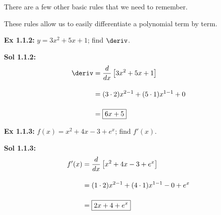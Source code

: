 There are a few other basic rules that we need to remember. 

\begin{center}
\end{center}

These rules allow us to easily differentiate a polynomial term by term.

\begin{tcolorbox}[example]
    \textbf{Ex 1.1.2: } $y = 3x^2 + 5x + 1$; find $\deriv$. 
\end{tcolorbox}
\begin{tcolorbox}[solution]
    \textbf{Sol 1.1.2: } \begin{align*}
        \deriv & = \diff \left[3x^2 + 5x + 1\right] \\[11pt]
        & = (3 \cdot 2)x^{2 - 1} + (5 \cdot 1)x^{1 - 1} + 0 \\[11pt]
        & = \boxed{6x + 5} 
    \end{align*}
\end{tcolorbox} \vspace{11pt}

\begin{tcolorbox}[example]
    \textbf{Ex 1.1.3: } $f(x) = x^2 + 4x - 3 + e^x$; find $f'(x)$. 
\end{tcolorbox}
\begin{tcolorbox}[solution]
    \textbf{Sol 1.1.3: } \begin{align*}
        f'(x) & = \dfrac{d}{dx} \left[x^2 + 4x - 3 + e^x\right] \\[11pt]
        & = (1 \cdot 2)x^{2 - 1} + (4 \cdot 1)x^{1 - 1} - 0 + e^x \\[11pt]
        & = \boxed{2x + 4 + e^x} 
    \end{align*}
\end{tcolorbox} \vspace{11pt}

